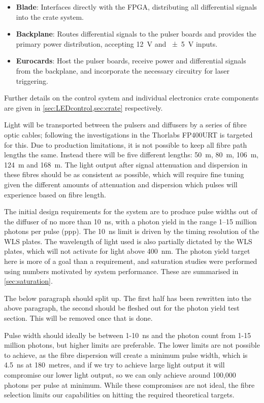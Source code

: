 \documentclass[a4paper,11pt]{article}
\begin{document}
\begin{itemize}
\item \textbf{Blade}: Interfaces directly with the FPGA, distributing all differential signals into the crate system.
\item \textbf{Backplane}: Routes differential signals to the pulser boards and provides the primary power distribution, accepting \SI{12}{\volt} and \SI{\pm5}{\volt} inputs.
\item \textbf{Eurocards}: Host the pulser boards, receive power and differential signals from the backplane, and incorporate the necessary circuitry for laser triggering.
\end{itemize}
Further details on the control system and individual electronics crate components are given in \cref{sec:LEDcontrol,sec:crate} respectively.

Light will be transported between the pulsers and diffusers by a series of fibre optic cables; following the investigations in \cite{TN91} the Thorlabs FP400URT \cite{FP400URT} is targeted for this. Due to production limitations, it is not possible to keep all fibre path lengths the same. Instead there will be five different lengths: 50~m, 80~m, 106~m, 124~m and 168~m. The light output after signal attenuation and dispersion in these fibres should be as consistent as possible, which will require fine tuning given the different amounts of attenuation and dispersion which pulses will experience based on fibre length.

The initial design requirements for the system are to produce pulse widths out of the diffuser of no more than 10~ns, with a photon yield in the range 1--15 million photons per pulse (ppp). The 10~ns limit is driven by the timing resolution of the WLS plates. The wavelength of light used is also partially dictated by the WLS plates, which will not activate for light above 400~nm. The photon yield target here is more of a goal than a requirement, and saturation studies were performed using numbers motivated by system performance. These are summarised in \cref{sec:saturation}.

{\color{red} The below paragraph should split up. The first half has been rewritten into the above paragraph, the second should be fleshed out for the photon yield test section. This will be removed once that is done.

Pulse width should ideally be between 1-10~ns and the photon count from 1-15 million photons, but higher limits are preferable. The lower limits are not possible to achieve, as the fibre dispersion will create a minimum pulse width, which is 4.5~ns at 180~metres, and if we try to achieve large light output it will compromise our lower light output, so we can only achieve around 100,000 photons per pulse at minimum. While these compromises are not ideal, the fibre selection limits our capabilities on hitting the required theoretical targets.
}
\end{document}
